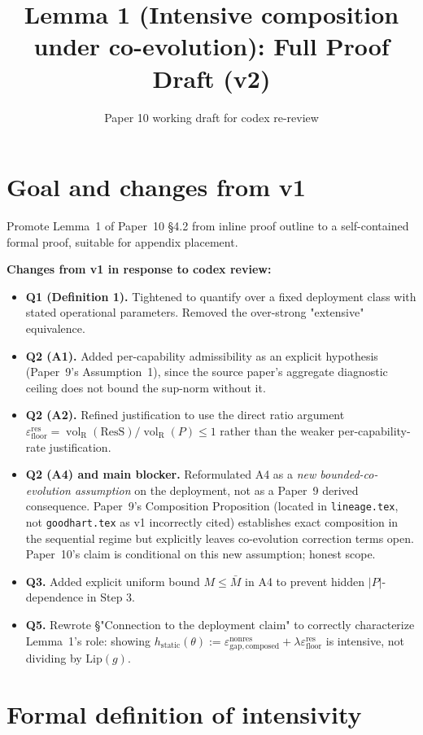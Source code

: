 \documentclass{article}
\title{Lemma 1 (Intensive composition under co-evolution): Full Proof Draft (v2)}
\author{Paper 10 working draft for codex re-review}
\date{}
\DeclareMathOperator{\vol}{vol}
\newcommand{\volR}{{\vol_{\mathrm{R}}}}
\newcommand{\epsfloor}{\varepsilon_{\mathrm{floor}}^{\mathrm{res}}}
\newcommand{\epsnonresComposed}{\varepsilon_{\mathrm{gap},\mathrm{composed}}^{\mathrm{nonres}}}
\newcommand{\ResS}{\mathrm{ResS}}
\begin{document}
\maketitle

\section{Goal and changes from v1}

Promote Lemma~1 of Paper~10 \S4.2 from inline proof outline to a
self-contained formal proof, suitable for appendix placement.

\textbf{Changes from v1 in response to codex review:}
\begin{itemize}
\item \textbf{Q1 (Definition 1).} Tightened to quantify over a
  fixed deployment class with stated operational parameters. Removed
  the over-strong "extensive" equivalence.
\item \textbf{Q2 (A1).} Added per-capability admissibility as an
  explicit hypothesis (Paper~9's Assumption~1), since the source
  paper's aggregate diagnostic ceiling does not bound the sup-norm
  without it.
\item \textbf{Q2 (A2).} Refined justification to use the direct
  ratio argument $\epsfloor = \volR(\ResS)/\volR(P) \leq 1$ rather
  than the weaker per-capability-rate justification.
\item \textbf{Q2 (A4) and main blocker.} Reformulated A4 as a
  \emph{new bounded-co-evolution assumption} on the deployment, not
  as a Paper~9 derived consequence. Paper~9's Composition
  Proposition (located in \texttt{lineage.tex}, not
  \texttt{goodhart.tex} as v1 incorrectly cited) establishes exact
  composition in the sequential regime but explicitly leaves
  co-evolution correction terms open. Paper~10's claim is
  conditional on this new assumption; honest scope.
\item \textbf{Q3.} Added explicit uniform bound $M \leq \bar{M}$
  in A4 to prevent hidden $|P|$-dependence in Step 3.
\item \textbf{Q5.} Rewrote §"Connection to the deployment claim"
  to correctly characterize Lemma~1's role: showing
  $h_{\mathrm{static}}(\theta) := \epsnonresComposed + \lambda
  \epsfloor$ is intensive, not dividing by $\mathrm{Lip}(g)$.
\end{itemize}

\section{Formal definition of intensivity}
\end{document}
